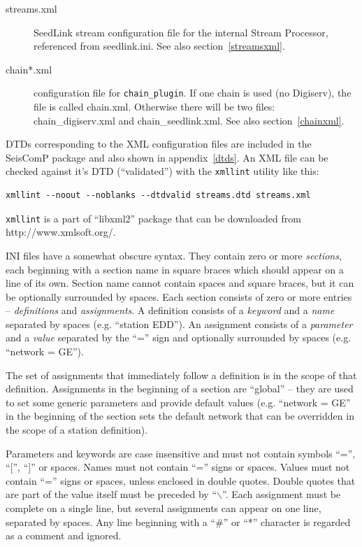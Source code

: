 \documentclass[11pt,a4paper,titlepage]{article}
\begin{document}
\begin{description}
\item[streams.xml] SeedLink stream configuration file for the internal
Stream Processor, referenced from seedlink.ini. See also
section~\ref{streamsxml}.

\item[chain*.xml] configuration file for \verb+chain_plugin+. If one chain
is used (no Digiserv), the file is called chain.xml. Otherwise there will
be two files: chain\_digiserv.xml and chain\_seedlink.xml. See also
section~\ref{chainxml}.

\end{description}

DTDs corresponding to the XML configuration files are included in the
SeisComP package and also shown in appendix~\ref{dtds}. An XML file can be
checked against it's DTD (``validated'') with the \verb+xmllint+ utility
like this:

\begin{verbatim}
xmllint --noout --noblanks --dtdvalid streams.dtd streams.xml
\end{verbatim}

\verb+xmllint+ is a part of ``libxml2'' package that can be downloaded from
http://www.xmlsoft.org/.

INI files have a somewhat obscure syntax. They contain zero or more
\emph{sections}, each beginning with a section name in square braces
which should appear on a line of its own.  Section name cannot contain
spaces and square braces, but it can be optionally surrounded by
spaces. Each section consists of zero or more
entries -- \emph{definitions} and \emph{assignments}. A definition
consists of a \emph{keyword} and a \emph{name} separated by spaces
(e.g. ``station EDD'').  An assignment consists of a \emph{parameter}
and a \emph{value} separated by the ``='' sign and optionally
surrounded by spaces (e.g. ``network = GE'').

The set of assignments that immediately follow a definition is in the scope
of that definition. Assignments in the beginning of a section are
``global'' -- they are used to set some generic parameters and provide
default values (e.g.  ``network = GE'' in the beginning of the section sets
the default network that can be overridden in the scope of a station
definition).

Parameters and keywords are case insensitive and must not contain
symbols ``='', ``['', ``]'' or spaces. Names must not contain ``=''
signs or spaces. Values must not contain ``='' signs or spaces, unless
enclosed in double quotes. Double quotes that are part of the value
itself must be preceded by ``$\backslash$''. Each assignment must be
complete on a single line, but several assignments can appear on one
line, separated by spaces. Any line beginning with a ``\#'' or ``*''
character is regarded as a comment and ignored.
\end{document}
